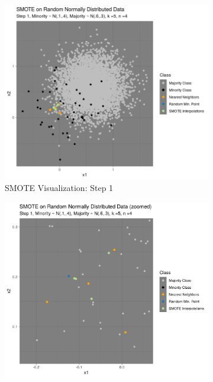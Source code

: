\documentclass[12pt,a4paper]{article}
\begin{document}
\begin{figure}[] %
\begin{subfigure}{0.48\textwidth}
\includegraphics[width=\linewidth]{./graphics/knn001.png}
\caption{SMOTE Visualization: Step 1} \label{fig:a}
\end{subfigure}\hspace*{\fill}
\begin{subfigure}{0.48\textwidth}
\includegraphics[width=\linewidth]{./graphics/knn_zoom001.png}

\end{subfigure}
\end{figure}
\end{document}
